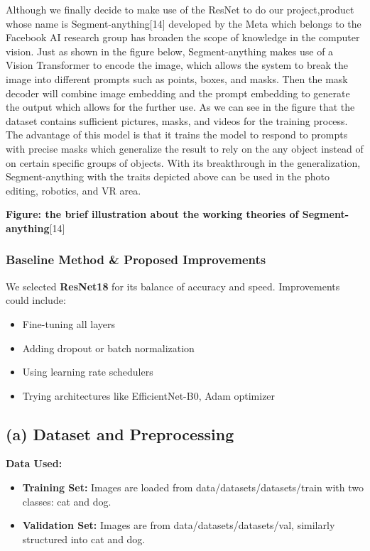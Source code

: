 Although we finally decide to make use of the ResNet to do our
project,product whose name is Segment-anything{[}14{]} developed by the
Meta which belongs to the Facebook AI research group has broaden the
scope of knowledge in the computer vision. Just as shown in the figure
below, Segment-anything makes use of a Vision Transformer to encode the
image, which allows the system to break the image into different prompts
such as points, boxes, and masks. Then the mask decoder will combine
image embedding and the prompt embedding to generate the output which
allows for the further use. As we can see in the figure that the dataset
contains sufficient pictures, masks, and videos for the training
process. The advantage of this model is that it trains the model to
respond to prompts with precise masks which generalize the result to
rely on the any object instead of on certain specific groups of objects.
With its breakthrough in the generalization, Segment-anything with the
traits depicted above can be used in the photo editing, robotics, and VR
area.

\textbf{Figure: the brief illustration about the working theories of
Segment-anything}{[}14{]}

\subsubsection{Baseline Method \& Proposed
Improvements}\label{baseline-method-proposed-improvements}

We selected \textbf{ResNet18} for its balance of accuracy and speed.
Improvements could include:

\begin{itemize}
\tightlist
\item
  Fine-tuning all layers
\item
  Adding dropout or batch normalization
\item
  Using learning rate schedulers
\item
  Trying architectures like EfficientNet-B0, Adam optimizer
\end{itemize}

\subsection{\texorpdfstring{\textbf{(a)} Dataset and
Preprocessing}{(a) Dataset and Preprocessing}}\label{a-dataset-and-preprocessing}

\textbf{Data Used:}

\begin{itemize}
\tightlist
\item
  \textbf{Training Set:} Images are loaded from
  data/datasets/datasets/train with two classes: cat and dog.
\item
  \textbf{Validation Set:} Images are from data/datasets/datasets/val,
  similarly structured into cat and dog.
\end{itemize}

